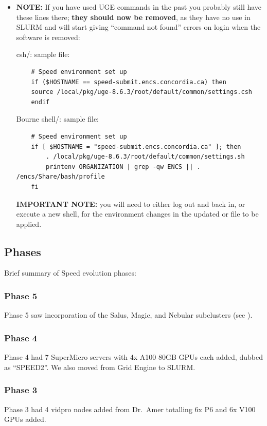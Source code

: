 \begin{itemize}
\item
\textbf{NOTE:} If you have used UGE commands in the past you probably still have these
lines there; \textbf{they should now be removed}, as they have no use in SLURM and
will start giving ``command not found'' errors on login when the software is removed:

csh/: sample  file:
\begin{verbatim}
    # Speed environment set up
    if ($HOSTNAME == speed-submit.encs.concordia.ca) then
    source /local/pkg/uge-8.6.3/root/default/common/settings.csh
    endif
\end{verbatim}

Bourne shell/: sample  file:
\begin{verbatim}
    # Speed environment set up
    if [ $HOSTNAME = "speed-submit.encs.concordia.ca" ]; then
        . /local/pkg/uge-8.6.3/root/default/common/settings.sh
        printenv ORGANIZATION | grep -qw ENCS || . /encs/Share/bash/profile
    fi
\end{verbatim}

\textbf{IMPORTANT NOTE:} you will need to either log out and back in, or execute a new shell, 
for the environment changes in the updated  or  file to be applied.
\end{itemize}

\subsection{Phases}
\label{sect:phases}

Brief summary of Speed evolution phases:

\subsubsection{Phase 5}
Phase 5 saw incorporation of the Salus, Magic, and Nebular
subclusters (see ).

\subsubsection{Phase 4}
Phase 4 had 7 SuperMicro servers with 4x A100 80GB GPUs each added,
dubbed as ``SPEED2''. We also moved from Grid Engine to SLURM.

\subsubsection{Phase 3}
Phase 3 had 4 vidpro nodes added from Dr.~Amer totalling 6x P6 and 6x V100
GPUs added.

